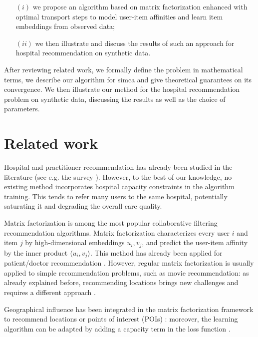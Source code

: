 \begin{itemize}
    \item[$(i)$] we propose an algorithm based on matrix factorization enhanced
        with optimal transport steps to model user-item affinities and learn item
        embeddings from observed data;
    \item[$(ii)$] we then illustrate and discuss the results of such an approach
        for hospital recommendation on synthetic data.
\end{itemize}

After reviewing related work, we formally define the problem in mathematical
terms, we describe our algorithm for \ac{simca} and give theoretical guarantees
on its convergence. We then illustrate our method for the hospital
recommendation problem on synthetic data, discussing the results as well as the
choice of parameters.

\section{Related work}
Hospital and practitioner recommendation has already been studied in the
literature (see e.g. the survey \cite{tran_recommender_2021}). However, to the
best of our knowledge, no existing method incorporates hospital capacity
constraints in the algorithm training. This tends to refer many users to the
same hospital, potentially saturating it and degrading the overall care quality.

Matrix factorization \cite{koren_matrix_2009} is among the most popular
collaborative filtering recommendation algorithms. Matrix factorization
characterizes every user $i$ and item $j$ by high-dimensional embeddings $u_i,
    v_j$, and predict the user-item affinity by the inner product $\langle u_i, v_j
    \rangle$. This method has already been applied for patient/doctor recommendation
\cite{zhang_idoctor_2017, han_hybrid_2018}. However, regular matrix
factorization is usually applied to simple recommendation problems, such as
movie recommendation: as already explained before, recommending locations brings
new challenges and requires a different approach \cite{zhao_survey_2016}.

Geographical influence has been integrated in the matrix factorization framework
to recommend locations or points of interest (POIs) \cite{li_rank-geofm_2015}:
moreover, the learning algorithm can be adapted by adding a capacity term in the
loss function \cite{christakopoulou_recommendation_2017}.

